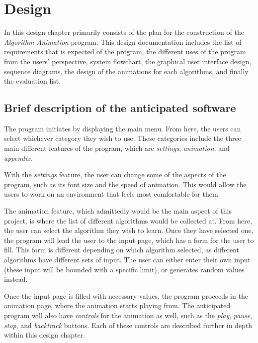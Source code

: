 \chapter{Design}

In this design chapter primarily consists of the plan for the construction of the \textit{Algorithm Animation} program. This design documentation includes the list of requirements that is expected of the program, the different uses of the program from the users' perspective, system flowchart, the graphical user interface design, sequence diagrams, the design of the animations for each algorithms, and finally the evaluation list.

\section{Brief description of the anticipated software}
The program initiates by displaying the main menu. From here, the users can select whichever category they wish to use. These categories include the three main different features of the program, which are \textit{settings}, \textit{animation}, and \textit{appendix}. 

With the \textit{settings} feature, the user can change some of the aspects of the program, such as its font size and the speed of animation. This would allow the users to work on an environment that feels most comfortable for them.

The animation feature, which admittedly would be the main aspect of this project, is where the list of different algorithms would be collected at. From here, the user can select the algorithm they wish to learn. Once they have selected one, the program will lead the user to the input page, which has a form for the user to fill. This form is different depending on which algorithm selected, as different algorithms have different sets of input. The user can either enter their own input (these input will be bounded with a specific limit), or generates random values instead. 

Once the input page is filled with necessary values, the program proceeds in the animation page, where the animation starts playing from. The anticipated program will also have \textit{controls} for the animation as well, such as the \textit{play}, \textit{pause}, \textit{stop}, and \textit{backtrack} buttons. Each of these controls are described further in depth within this design chapter.

